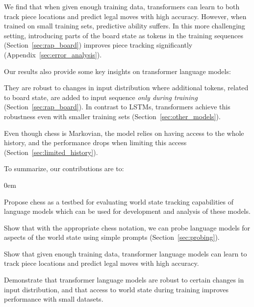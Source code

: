 We find that when given enough training data, transformers can learn to both track piece locations and predict legal moves with high accuracy.
However, when trained on small training sets, predictive ability suffers. 
In this more challenging setting, introducing parts of the board state as tokens in the training sequences (Section~\ref{sec:rap_board})  improves piece tracking significantly (Appendix~\ref{sec:error_analysis}). 




Our results also provide some key insights on transformer language models:
\begin{enumerate*}[label=(\roman*)]
	\item They are robust to changes in input distribution where additional tokens, related to board state, are added to input sequence \emph{only during training} (Section~\ref{sec:rap_board}). 
	In contrast to LSTMs, transformers achieve this robustness even with smaller training sets (Section~\ref{sec:other_models}). 
	\item Even though chess is Markovian, the model relies on having access to the whole history, and the performance drops when limiting this access (Section~\ref{sec:limited_history}). 
\end{enumerate*}


\newpage
To summarize, our contributions are to: 

\begin{itemizesquish}
	\itemsep0em 
	\item Propose chess as a testbed for evaluating world state tracking capabilities of language models which can be used for development and analysis of these models.
	\item Show that with the appropriate chess notation, we can probe language models for aspects of the world state using simple prompts (Section~\ref{sec:probing}).
	\item Show that given enough training data, transformer language models can learn to track piece locations and predict legal moves with high accuracy.
	\item Demonstrate that transformer language models are robust to certain changes in input distribution, 
	and that access to world state during training improves performance with small datasets. 
 	
	 
	 
\end{itemizesquish}

